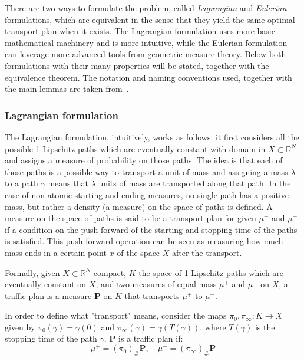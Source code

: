 \documentclass[12pt,a4paper]{article}
\numberwithin{equation}{section}
\theoremstyle{mytheorem}
\theoremstyle{myremark}
\theoremstyle{myparagraph}
\begin{document}
    There are two ways to formulate the problem, called \textit{Lagrangian} and \textit{Eulerian} formulations, which are equivalent in the sense that they yield the same optimal transport plan
    when it exists. The Lagrangian formulation uses more basic mathematical machinery and is more intuitive, while the Eulerian formulation can leverage more advanced tools from geometric measure theory.
    Below both formulations with their many properties will be stated, together with the equivalence theorem. The notation and naming conventions used, together with the main lemmas are taken from~\cite[Chapter 2 - 5]{Bernot}.

    \subsubsection{Lagrangian formulation}

    The Lagrangian formulation, intuitively, works as follows: it first considers all the possible 1-Lipschitz paths which are eventually constant with domain in $X \subset \mathbb{R}^N$ and assigns
    a measure of probability on those paths. The idea is that each of those paths is a possible way to transport a unit of mass and assigning a mass $\lambda$ to a path $\gamma$
    means that $\lambda$ units of mass are transported along that path. In the case of non-atomic starting and ending measures, no single path
    has a positive mass, but rather a density (a measure) on the space of paths is defined. A measure on the space of paths is said to be a transport plan
    for given $\mu^+$ and $\mu^-$ if a condition on the push-forward of the starting and stopping time of the paths is satisfied. This push-forward operation
    can be seen as measuring how much mass ends in a certain point $x$ of the space $X$ after the transport.

    Formally, given $X \subset \mathbb{R}^N$ compact, $K$ the space of 1-Lipschitz paths which are eventually constant on $X$, and
    two measures of equal mass $\mu^+$ and $\mu^-$ on $X$, a traffic plan is a measure $\mathbf{P}$ on $K$ that transports $\mu^+$ to $\mu^-$.

    In order to define what "transport" means, consider the maps $\pi_0, \pi_\infty : K \rightarrow X$ given by $\pi_0(\gamma) = \gamma(0)$ and $\pi_\infty(\gamma) = \gamma(T(\gamma))$, where $T(\gamma)$
    is the stopping time of the path $\gamma$.
    $\mathbf{P}$ is a traffic plan if:
    \[
        \mu^+ = (\pi_0)_{\#}\mathbf{P}, \quad \mu^- = (\pi_\infty)_{\#}\mathbf{P}
    \]
\end{document}

